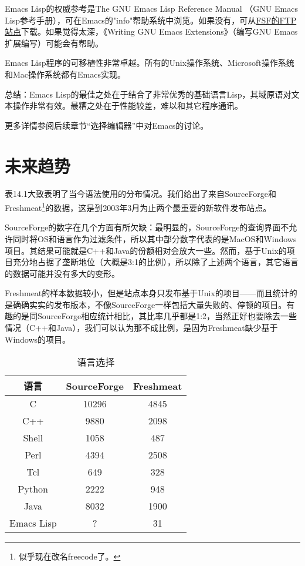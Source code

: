 \documentclass[12pt,oneside]{book}
\begin{document}
\begin{common-format}
Emacs Lisp的权威参考是The GNU Emacs Lisp Reference Manual （GNU Emacs Lisp参考手册），可在Emacs的"info"帮助系统中浏览。如果没有，可从\href{ftp://ftp.gnu.org/pub/gnu}{FSF的FTP站点}下载。如果觉得太深，《Writing GNU Emacs Extensions》（编写GNU Emacs扩展编写）\cite{Glickstein}可能会有帮助。

Emacs Lisp程序的可移植性非常卓越。所有的Unix操作系统、Microsoft操作系统和Mac操作系统都有Emacs实现。

总结：Emacs Lisp的最佳之处在于结合了非常优秀的基础语言Lisp，其域原语对文本操作非常有效。最糟之处在于性能较差，难以和其它程序通讯。

更多详情参阅后续章节“选择编辑器”中对Emacs的讨论。


\section{未来趋势}
表14.1大致表明了当今语法使用的分布情况。我们给出了来自SourceForge和Freshmeat\footnote{似乎现在改名freecode了。}的数据，这是到2003年3月为止两个最重要的新软件发布站点。

SourceForge的数字在几个方面有所欠缺：最明显的，SourceForge的查询界面不允许同时将OS和语言作为过滤条件，所以其中部分数字代表的是MacOS和Windows项目。其结果可能就是C++和Java的份额相对会放大一些。然而，基于Unix的项目充分地占据了垄断地位（大概是3:1的比例），所以除了上述两个语言，其它语言的数据可能并没有多大的变形。

Freshmeat的样本数据较小，但是站点本身只发布基于Unix的项目——而且统计的是确确实实的发布版本，不像SourceForge一样包括大量失败的、停顿的项目。有趣的是同SourceForge相应统计相比，其比率几乎都是1:2，当然正好也要除去一些情况（C++和Java），我们可以认为那不成比例，是因为Freshmeat缺少基于Windows的项目。

\begin{table}[H]
\centering
\caption{语言选择}
\label{tab:语言选择}
\medskip 
\begin{tabular}{@{}ccc@{}}
\toprule
语言 & SourceForge &  Freshmeat  \\ \midrule
C & 10296 & 4845 \\
C++ & 9880 & 2098 \\
Shell & 1058 & 487\\
Perl & 4394 & 2508\\
Tcl	 & 649 & 328\\
Python & 2222 & 948\\
Java & 8032 & 1900\\
Emacs Lisp & ? & 31
 \\ \bottomrule
\end{tabular}
\end{table}


\end{common-format}
\end{document}
